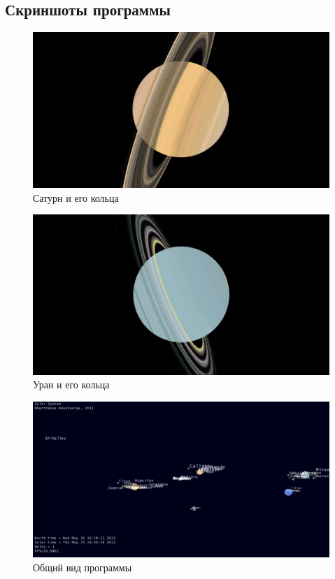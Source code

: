 \documentclass[oneside,final]{article}
\begin{document}
\subsection{Скриншоты программы}
\begin{figure}[h!]
    \includegraphics{s1.png}
    \caption{Сатурн и его кольца}
\end{figure}
\begin{figure}[h!]
    \includegraphics{s2.png}
    \caption{Уран и его кольца}
\end{figure}
\begin{figure}[h!]
    \includegraphics{s3.png}
    \caption{Общий вид программы}
\end{figure}
\end{document}
